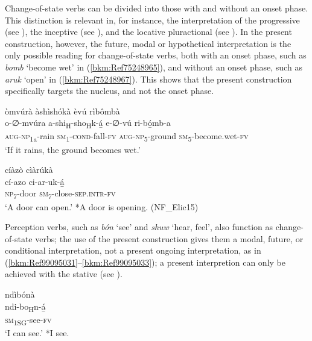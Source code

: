 Change-of-state verbs can be divided into those with and without an onset phase. This distinction is relevant in, for instance, the interpretation of the progressive (see ), the inceptive (see ), and the locative pluractional (see ). In the present construction, however, the future, modal or hypothetical interpretation is the only possible reading for change-of-state verbs, both with an onset phase, such as \textit{bomb} ‘become wet’ in (\ref{bkm:Ref75248965}), and without an onset phase, such as \textit{aruk} ‘open’ in (\ref{bkm:Ref75248967}). This shows that the present construction specifically targets the nucleus, and not the onset phase.

\ea
\label{bkm:Ref75248965}
òmvúrà àshìshókà èvú rìbômbà\\
\gll o-∅-mvúra    a-shi\textsubscript{H}-sho\textsubscript{H}k-á̲ e-∅-vú    ri-bó̲mb-a \\
\textsc{aug}-\textsc{np}\textsubscript{1a}-rain  \textsc{sm}\textsubscript{1}-\textsc{cond}-fall-\textsc{fv}
\textsc{aug}-\textsc{np}\textsubscript{5}-ground  \textsc{sm}\textsubscript{5}-become.wet-\textsc{fv}\\
\glt ‘If it rains, the ground becomes wet.’
\z

\ea
\label{bkm:Ref75248967}
cíàzò cìàrúkà \\
\gll cí-azo    ci-ar-uk-á̲\\
\textsc{np}\textsubscript{7}-door  \textsc{sm}\textsubscript{7}-close-\textsc{sep}.\textsc{intr}-\textsc{fv}\\
\glt ‘A door can open.’ *A door is opening. (NF\_Elic15)
\z

\begin{sloppypar}
Perception verbs, such as \textit{bón} ‘see’ and \textit{shuw} ‘hear, feel’, also function as change-of-state verbs; the use of the present construction gives them a modal, future, or conditional interpretation, not a present ongoing interpretation, as in (\ref{bkm:Ref99095031}--\ref{bkm:Ref99095033}); a present interpretion can only be achieved with the stative (see ).
\end{sloppypar}

\ea
\label{bkm:Ref99095031}
\glll ndìbónà\\
ndi-bo\textsubscript{H}n-á̲\\
\textsc{sm}\textsubscript{1SG}-see-\textsc{fv}\\
\glt ‘I can see.’ *I see.
\z

